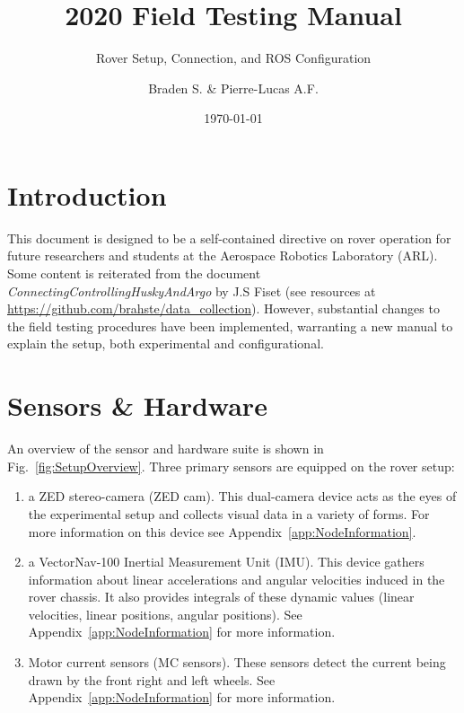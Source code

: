\documentclass[
	12pt, %
]{fphw}
\title{2020 Field Testing Manual}
\subtitle{Rover Setup, Connection, and ROS Configuration}
\author{Braden S. \& Pierre-Lucas A.F.}
\date{\today}
\institute{Areospace Robotics Laboratory}
\begin{document}
\maketitle


\section{Introduction}

This document is designed to be a self-contained directive on rover operation for future researchers and students at the Aerospace Robotics Laboratory (ARL). Some content is reiterated from the document \textit{ConnectingControllingHuskyAndArgo} by J.S Fiset (see resources at \url{https://github.com/brahste/data_collection}). However, substantial changes to the field testing procedures have been implemented, warranting a new manual to explain the setup, both experimental and configurational.


\section{Sensors \& Hardware}
\label{sec:SensorsAndHardware}

An overview of the sensor and hardware suite is shown in Fig.~\ref{fig:SetupOverview}. Three primary sensors are equipped on the rover setup:
\begin{enumerate}
	\item a ZED stereo-camera (ZED cam). This dual-camera device acts as the eyes of the experimental setup and collects visual data in a variety of forms. For more information on this device see Appendix~\ref{app:NodeInformation}.
	\item a VectorNav-100 Inertial Measurement Unit (IMU). This device gathers information about linear accelerations and angular velocities  induced in the rover chassis. It also provides integrals of these dynamic values (linear velocities, linear positions, angular positions). See Appendix~\ref{app:NodeInformation} for more information.
	\item Motor current sensors (MC sensors). These sensors detect the current being drawn by the front right and left wheels. See Appendix~\ref{app:NodeInformation} for more information.
\end{enumerate}
\end{document}
